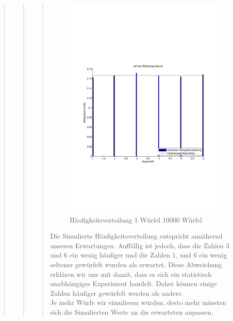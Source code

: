 \begin{quote}
\begin{quote}
\begin{quote}
                
                \begin{figure}[H] \centering
                    \includegraphics[scale=0.5, trim = 2cm 6.5cm 1.5cm 8.5cm, clip]{./Bilder/1wuerfelpdf}
                        \caption{Häufigkeitsverteilung 1 Würfel 10000 Würfel}
                \end{figure}
                
                Die Simulierte Häufigkeitsverteilung entspricht annähernd unseren Erwartungen. Auffällig ist jedoch,
                dass die Zahlen $3$ und $6$ ein wenig häufiger und die Zahlen $1$, und $6$ ein wenig seltener gewürfelt
                wurden als erwartet.
                Diese Abweichung erklären wir uns mit damit, dass es sich ein statistisch unabhängiges Experiment
                handelt. Daher können einige Zahlen häufiger gewürfelt werden als andere.\\
                Je mehr Würfe wir simulieren würden, desto mehr müssten sich die
                Simulierten Werte an die erwarteten anpassen.\\
        \end{quote}
        

\end{quote}
\end{quote}
